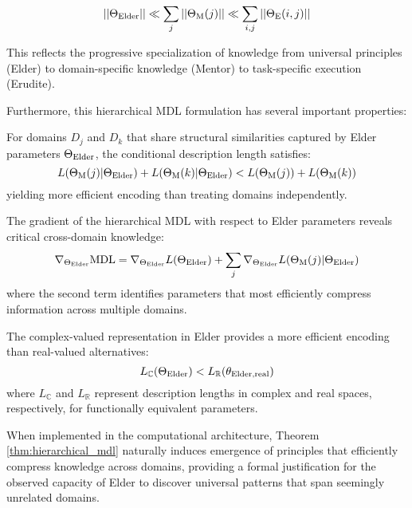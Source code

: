 \begin{theorem}
\begin{align}
    ||\Theta_{\text{Elder}}|| \ll \sum_j ||\Theta_{\text{M}}(j)|| \ll \sum_{i,j} ||\Theta_{\text{E}}(i,j)||
\end{align}

This reflects the progressive specialization of knowledge from universal principles (Elder) to domain-specific knowledge (Mentor) to task-specific execution (Erudite).

Furthermore, this hierarchical MDL formulation has several important properties:

\begin{corollary}
\label{cor:efficient_transfer}
For domains $D_j$ and $D_k$ that share structural similarities captured by Elder parameters $\Theta_{\text{Elder}}$, the conditional description length satisfies:
\begin{equation}
    L(\Theta_{\text{M}}(j) | \Theta_{\text{Elder}}) + L(\Theta_{\text{M}}(k) | \Theta_{\text{Elder}}) < L(\Theta_{\text{M}}(j)) + L(\Theta_{\text{M}}(k))
\end{equation}
yielding more efficient encoding than treating domains independently.
\end{corollary}

\begin{corollary}
\label{cor:information_gradients}
The gradient of the hierarchical MDL with respect to Elder parameters reveals critical cross-domain knowledge:
\begin{equation}
    \nabla_{\Theta_{\text{Elder}}}\text{MDL} = \nabla_{\Theta_{\text{Elder}}}L(\Theta_{\text{Elder}}) + \sum_j \nabla_{\Theta_{\text{Elder}}}L(\Theta_{\text{M}}(j) | \Theta_{\text{Elder}})
\end{equation}
where the second term identifies parameters that most efficiently compress information across multiple domains.
\end{corollary}

\begin{corollary}
\label{cor:complex_compression}
The complex-valued representation in Elder provides a more efficient encoding than real-valued alternatives:
\begin{equation}
    L_{\mathbb{C}}(\Theta_{\text{Elder}}) < L_{\mathbb{R}}(\theta_{\text{Elder,real}})
\end{equation}
where $L_{\mathbb{C}}$ and $L_{\mathbb{R}}$ represent description lengths in complex and real spaces, respectively, for functionally equivalent parameters.
\end{corollary}

When implemented in the computational architecture, Theorem \ref{thm:hierarchical_mdl} naturally induces emergence of principles that efficiently compress knowledge across domains, providing a formal justification for the observed capacity of Elder to discover universal patterns that span seemingly unrelated domains.
\end{theorem}

